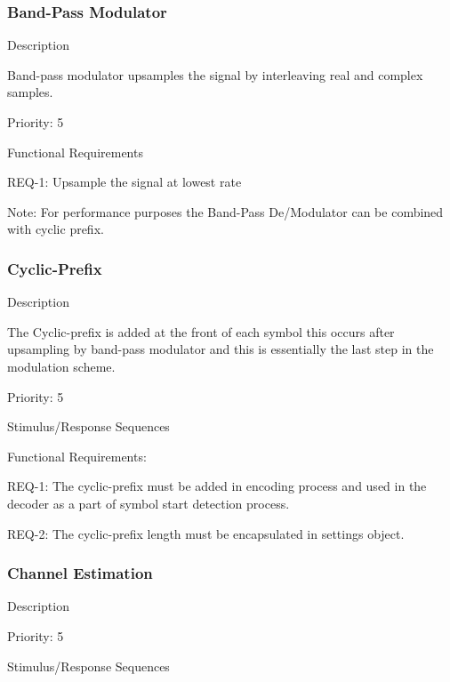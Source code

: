 \documentclass[]{report}
\begin{document}
\subsubsection{Band-Pass Modulator}

Description \par
Band-pass modulator upsamples the signal by interleaving real and complex samples. \par

Priority: 5 \par

Functional Requirements \par
REQ-1: Upsample the signal at lowest rate \par

Note: For performance purposes the Band-Pass De/Modulator can be combined with cyclic prefix.\par


\subsubsection{Cyclic-Prefix}

Description\par
The Cyclic-prefix is added at the front of each symbol this occurs after upsampling by band-pass modulator and this is essentially the last step in the modulation scheme. \par

Priority: 5  \par
 
Stimulus/Response Sequences \par

Functional Requirements:\par
REQ-1: The cyclic-prefix must be added in encoding process and used in the decoder as a part of symbol start detection process. \par 
REQ-2: The cyclic-prefix length must be encapsulated in settings object. \par


\subsubsection{Channel Estimation}

Description \par
\par

Priority: 5  \par

Stimulus/Response Sequences \par
\end{document}
